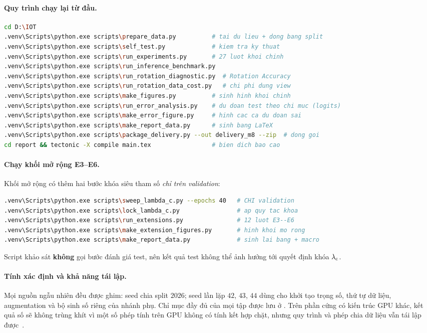 \paragraph{Quy trình chạy lại từ đầu.}
\begin{lstlisting}[language=bash,caption={Tái lập toàn bộ kết quả từ dữ liệu gốc.},label={lst:repro}]
cd D:\IOT
.venv\Scripts\python.exe scripts\prepare_data.py          # tai du lieu + dong bang split
.venv\Scripts\python.exe scripts\self_test.py             # kiem tra ky thuat
.venv\Scripts\python.exe scripts\run_experiments.py       # 27 luot khoi chinh
.venv\Scripts\python.exe scripts\run_inference_benchmark.py
.venv\Scripts\python.exe scripts\run_rotation_diagnostic.py  # Rotation Accuracy
.venv\Scripts\python.exe scripts\run_rotation_data_cost.py   # chi phi dung view
.venv\Scripts\python.exe scripts\make_figures.py          # sinh hinh khoi chinh
.venv\Scripts\python.exe scripts\run_error_analysis.py    # du doan test theo chi muc (logits)
.venv\Scripts\python.exe scripts\make_error_figure.py     # hinh cac ca du doan sai
.venv\Scripts\python.exe scripts\make_report_data.py      # sinh bang LaTeX
.venv\Scripts\python.exe scripts\package_delivery.py --out delivery_m8 --zip  # dong goi
cd report && tectonic -X compile main.tex                 # bien dich bao cao
\end{lstlisting}

\paragraph{Chạy khối mở rộng E3--E6.}
Khối mở rộng có thêm hai bước khóa siêu tham số \emph{chỉ trên validation}:
\begin{lstlisting}[language=bash,caption={Quy trình khối mở rộng, tách bạch thông tin với test.},label={lst:ext}]
.venv\Scripts\python.exe scripts\sweep_lambda_c.py --epochs 40   # CHI validation
.venv\Scripts\python.exe scripts\lock_lambda_c.py                # ap quy tac khoa
.venv\Scripts\python.exe scripts\run_extensions.py               # 12 luot E3--E6
.venv\Scripts\python.exe scripts\make_extension_figures.py       # hinh khoi mo rong
.venv\Scripts\python.exe scripts\make_report_data.py             # sinh lai bang + macro
\end{lstlisting}
Script khảo sát \textbf{không} gọi bước đánh giá test, nên kết quả test không thể ảnh hưởng
tới quyết định khóa $\lambda_{\mathrm{c}}$.

\paragraph{Tính xác định và khả năng tái lập.}
Mọi nguồn ngẫu nhiên đều được ghim: seed chia split $2026$; seed lần lặp $42$, $43$, $44$ dùng
cho khởi tạo trọng số, thứ tự dữ liệu, augmentation và bộ sinh số riêng của nhánh phụ. Chỉ mục
đầy đủ của mọi tập được lưu ở . Trên phần cứng có kiến trúc
GPU khác, kết quả số sẽ không trùng khít vì một số phép tính trên GPU không có tính kết hợp
chặt, nhưng quy trình và phép chia dữ liệu vẫn tái lập được~\cite{pytorch_reproducibility}.

